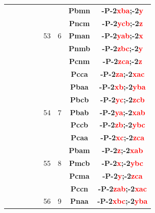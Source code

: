 \documentclass{article}      %
\begin{document}
\begin{small}
\begin{longtable}[c]{|c|c|c|c|c|c|c|c|c|}
          &  & & & &  & &\textbf{Pbmn}         &\textbf{-P-2\textcolor{red}{xba};-2\textcolor{red}{y}}\\\cline{8-9}       
          &  & & & &  & &\textbf{Pncm}         &\textbf{-P-2\textcolor{red}{ycb};-2\textcolor{red}{z}}\\\cline{8-9}       
	  &  & & & &\textrm{53}  &\textrm{6} &\textbf{Pman}         &\textbf{-P-2\textcolor{red}{yab};-2\textcolor{red}{x}}\\\cline{8-9}       
          &  & & & &  & &\textbf{Pnmb}         &\textbf{-P-2\textcolor{red}{zbc};-2\textcolor{red}{y}}\\\cline{8-9}       
          &  & & & &  & &\textbf{Pcnm}         &\textbf{-P-2\textcolor{red}{zca};-2\textcolor{red}{z}}\\\cline{6-9}       
          &  & & & &  & &\textbf{Pcca}         &\textbf{-P-2\textcolor{red}{za};-2\textcolor{red}{xac}}\\\cline{8-9}      
          &  & & & &  & &\textbf{Pbaa}         &\textbf{-P-2\textcolor{red}{xb};-2\textcolor{red}{yba}}\\\cline{8-9}      
          &  & & & &  & &\textbf{Pbcb}         &\textbf{-P-2\textcolor{red}{yc};-2\textcolor{red}{zcb}}\\\cline{8-9}      
	  &  & & & &\textrm{54}  &\textrm{7} &\textbf{Pbab}         &\textbf{-P-2\textcolor{red}{ya};-2\textcolor{red}{xab}}\\\cline{8-9}      
          &  & & & &  & &\textbf{Pccb}         &\textbf{-P-2\textcolor{red}{zb};-2\textcolor{red}{ybc}}\\\cline{8-9}      
          &  & & & &  & &\textbf{Pcaa}         &\textbf{-P-2\textcolor{red}{xc};-2\textcolor{red}{zca}}\\\cline{6-9}      
          &  & & & &  & &\textbf{Pbam}         &\textbf{-P-2\textcolor{red}{z};-2\textcolor{red}{xab}}\\\cline{8-9}       
	  &  & & & &\textrm{55}  &\textrm{8} &\textbf{Pmcb}         &\textbf{-P-2\textcolor{red}{x};-2\textcolor{red}{ybc}}\\\cline{8-9}       
          &  & & & &  & &\textbf{Pcma}         &\textbf{-P-2\textcolor{red}{y};-2\textcolor{red}{zca}}\\\cline{6-9}       
          &  & & & &  & &\textbf{Pccn}         &\textbf{-P-2\textcolor{red}{zab};-2\textcolor{red}{xac}}\\\cline{8-9}     
	  &  & & & &\textrm{56}  &\textrm{9} &\textbf{Pnaa}         &\textbf{-P-2\textcolor{red}{xbc};-2\textcolor{red}{yba}}\\\cline{8-9}     

\end{longtable}
\end{small}
\end{document}

